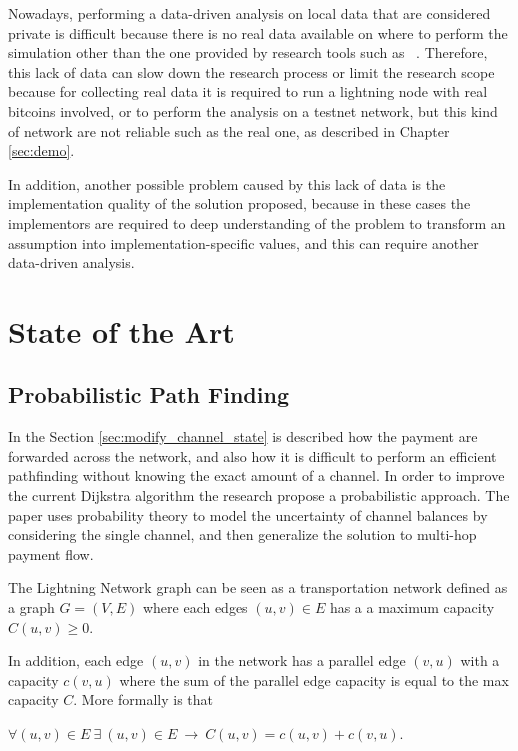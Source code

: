 Nowadays, performing a data-driven analysis on local data that are considered private
is difficult because there is no real data available on where to perform the simulation
other than the one provided by research tools such as ~\cite{lngossip}.
Therefore, this lack of data can slow down the research process or limit the 
research scope because for collecting real data it is required to run a lightning node 
with real bitcoins involved, or to perform the analysis on a 
testnet network, but this kind of network are not reliable such as 
the real one, as described in Chapter \ref{sec:demo}.

In addition, another possible problem caused by this lack of data is the implementation
quality of the solution proposed, because in these cases 
the implementors are required to deep understanding of the problem 
to transform an assumption into implementation-specific values, 
and this can require another data-driven analysis.

\section{State of the Art}

\subsection{Probabilistic Path Finding}

In the Section \ref{sec:modify_channel_state} is described how the payment are
forwarded across the network, and also how it is difficult to perform an efficient 
pathfinding without knowing the exact amount of a channel. 
In order to improve the current Dijkstra algorithm the research \cite{DBLP:journals/corr/abs-2103-08576}
propose a probabilistic approach.
The paper \cite{DBLP:journals/corr/abs-2103-08576} uses probability theory to 
model the uncertainty of channel balances by considering the single channel, 
and then generalize the solution to multi-hop payment flow.

The Lightning Network graph can be seen as a transportation network 
defined as a graph $G = (V, E)$ where each edges $(u, v) \in E$ has a 
a maximum capacity $C(u, v) \ge 0$.

In addition, each edge $(u, v)$ in the network has a parallel edge $(v, u)$ 
with a capacity $c(v, u)$ where the sum of the parallel edge capacity is
equal to the max capacity $C$. More formally is that 

\begin{center}
    $\forall (u, v) \in E \: \exists \: (u, v) \in E \: \rightarrow \: C(u, v) = c(u, v) + c(v, u)$.
\end{center}

